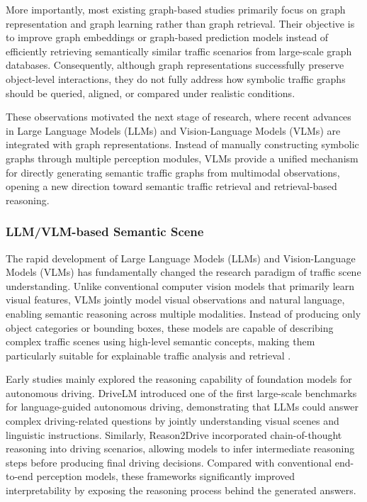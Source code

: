 \documentclass[a4paper, 11pt]{article} %
\begin{document}
More importantly, most existing graph-based studies primarily focus on graph representation and graph learning rather than graph retrieval. Their objective is to improve graph embeddings or graph-based prediction models instead of efficiently retrieving semantically similar traffic scenarios from large-scale graph databases. Consequently, although graph representations successfully preserve object-level interactions, they do not fully address how symbolic traffic graphs should be queried, aligned, or compared under realistic conditions.

These observations motivated the next stage of research, where recent advances in Large Language Models (LLMs) and Vision-Language Models (VLMs) are integrated with graph representations. Instead of manually constructing symbolic graphs through multiple perception modules, VLMs provide a unified mechanism for directly generating semantic traffic graphs from multimodal observations, opening a new direction toward semantic traffic retrieval and retrieval-based reasoning.
\subsubsection{LLM/VLM-based Semantic Scene}

The rapid development of Large Language Models (LLMs) and Vision-Language Models (VLMs) has fundamentally changed the research paradigm of traffic scene understanding. Unlike conventional computer vision models that primarily learn visual features, VLMs jointly model visual observations and natural language, enabling semantic reasoning across multiple modalities. Instead of producing only object categories or bounding boxes, these models are capable of describing complex traffic scenes using high-level semantic concepts, making them particularly suitable for explainable traffic analysis and retrieval \cite{zheng2025video}.

Early studies mainly explored the reasoning capability of foundation models for autonomous driving. DriveLM \cite{sima2023drivelm} introduced one of the first large-scale benchmarks for language-guided autonomous driving, demonstrating that LLMs could answer complex driving-related questions by jointly understanding visual scenes and linguistic instructions. Similarly, Reason2Drive \cite{gao2023reason2drive} incorporated chain-of-thought reasoning into driving scenarios, allowing models to infer intermediate reasoning steps before producing final driving decisions. Compared with conventional end-to-end perception models, these frameworks significantly improved interpretability by exposing the reasoning process behind the generated answers.
\end{document}
